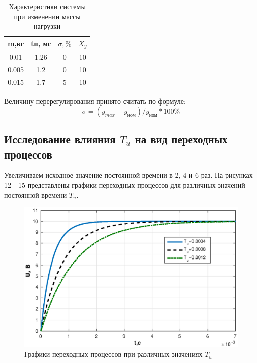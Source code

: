 \documentclass[12pt, a4paper]{article}
\begin{document}
\begin{table}[h!]
\centering
\begin{threeparttable}
\caption{Характеристики системы при изменении массы нагрузки}
\renewcommand{\arraystretch}{1.8}
\begin{tabular}{ |c|c|c|c|} 
 \hline
 m,кг & tп, мс & $\sigma, \%$ & $X_{y}$  \\ 
 \hline
  0.01 & 1.26  & 0 & 10  \\ 
 \hline
 0.005 & 1.2 & 0 & 10  \\ 
 \hline
 0.015 & 1.7 & 5 & 10  \\ 
 \hline
\end{tabular}
\end{threeparttable}
\end{table}
 Величину перерегулирования принято считать по формуле:
 \begin{equation}
  \sigma=(y_{max}-y_\text{ном})/y_\text{ном}*100\%
 \end{equation}

\newpage
\begin{center}
\section{Исследование влияния $T_{u}$ на вид переходных процессов} 
\end{center}
 \par Увеличиваем исходное значение постоянной времени в 2, 4 и 6 раз. На рисунках 12 - 15 представлены графики переходных
 процессов для различных значений постоянной времени $T_{u}$.
 \begin{figure}[H]
\centering
\includegraphics[width = \textwidth]{1/U3.eps}
\caption{Графики переходных процессов при различных значениях  $T_{u}$}
\end{figure}
\end{document}
